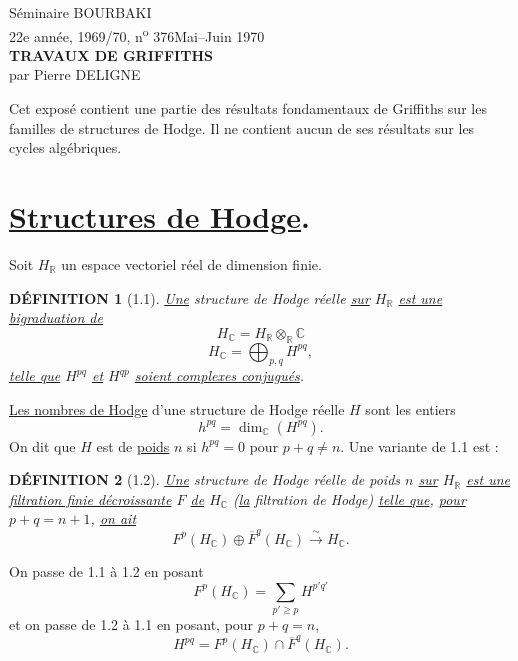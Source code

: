 \documentclass[10pt,leqno]{article}
\newcommand{\C}{\mathbb C}
\newcommand{\R}{\mathbb R}
\theoremstyle{deligne}
\newtheorem*{definition}{DÉFINITION}
\renewcommand{\underline}[1]{\uline{#1}}
\begin{document}
\begin{center}
Séminaire BOURBAKI\\
22e année, 1969/70, n\textsuperscript{o} 376\hfill Mai--Juin 1970\\[2.2em]
{\Large\bfseries TRAVAUX DE GRIFFITHS}\\[1.2em]
par Pierre DELIGNE
\end{center}

Cet exposé contient une partie des résultats fondamentaux de Griffiths sur les familles de structures de Hodge. Il ne contient aucun de ses résultats sur les cycles algébriques.

\section{\underline{Structures de Hodge}.}

Soit $H_\R$ un espace vectoriel réel de dimension finie.

\begin{definition}[1.1]
\underline{Une} structure de Hodge réelle \underline{sur} $H_\R$ \underline{est une bigraduation de}
\[
H_\C=H_\R\otimes_\R\C
\]
\[
H_\C=\bigoplus_{p,q}H^{pq},
\]
\underline{telle que} $H^{pq}$ \underline{et} $H^{qp}$ \underline{soient complexes conjugués}.
\end{definition}

\underline{Les nombres de Hodge} d'une structure de Hodge réelle $H$ sont les entiers
\[
h^{pq}=\dim_\C(H^{pq}).
\]
On dit que $H$ est de \underline{poids} $n$ si $h^{pq}=0$ pour $p+q\ne n$. Une variante de 1.1 est :

\begin{definition}[1.2]
\underline{Une} structure de Hodge réelle de poids $n$ \underline{sur} $H_\R$ \underline{est une filtration finie décroissante} $F$ \underline{de} $H_\C$ (\underline{la} filtration de Hodge) \underline{telle que}, \underline{pour} $p+q=n+1$, \underline{on ait}
\begin{equation}
F^p(H_\C)\oplus \overline F^{q}(H_\C)\xrightarrow{\sim}H_\C .
\tag{1.2.1}
\end{equation}
\end{definition}

On passe de 1.1 à 1.2 en posant
\begin{equation}
F^p(H_\C)=\sum_{p'\ge p}H^{p'q'}
\tag{1.2.2}
\end{equation}
et on passe de 1.2 à 1.1 en posant, pour $p+q=n$,
\begin{equation}
H^{pq}=F^p(H_\C)\cap \overline F^{q}(H_\C) .
\tag{1.2.3}
\end{equation}
\end{document}
